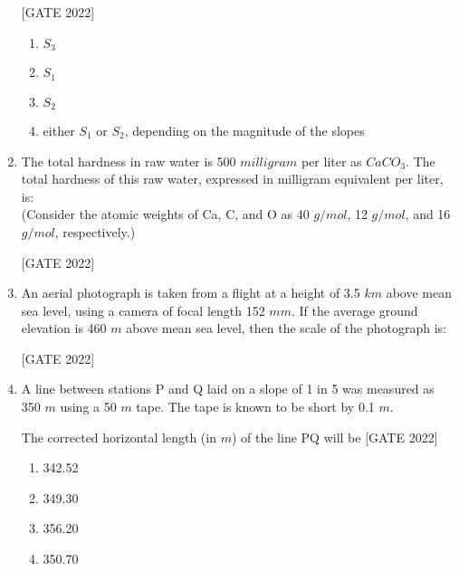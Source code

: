 \documentclass[journal,12pt,onecolumn]{IEEEtran}
\theoremstyle{remark}
\begin{document}
\begin{enumerate}
\hfill{[GATE 2022]}\begin{enumerate}
    \item  $ S_3  $
    \item  $ S_1  $
    \item  $ S_2  $
    \item either  $ S_1  $ or  $ S_2  $, depending on the magnitude of the slopes
\end{enumerate}

\item The total hardness in raw water is 500 $milligram$ per liter as $CaCO_3$. The total hardness of this raw water, expressed in milligram equivalent per liter, is:\\
(Consider the atomic weights of Ca, C, and O as 40 $g/mol$, 12 $g/mol$, and 16 $g/mol$, respectively.)

\hfill{[GATE 2022]}\begin{enumerate}
\end{enumerate}

\vspace{1em}

\item An aerial photograph is taken from a flight at a height of 3.5 $km$ above mean sea level, using a camera of focal length 152 $mm$. If the average ground elevation is 460 $m$ above mean sea level, then the scale of the photograph is:

\hfill{[GATE 2022]}\begin{enumerate}
\end{enumerate}

\item A line between stations P and Q laid on a slope of 1 in 5 was measured as 350 $m$ using a 50 $m$ tape. The tape is known to be short by 0.1 $m$.

The corrected horizontal length (in $m$) of the line PQ will be
\hfill{[GATE 2022]}
\begin{multicols}{4}
\begin{enumerate}
    \item 342.52
    \item 349.30
    \item 356.20
    \item 350.70
\end{enumerate}
\end{multicols}


\end{enumerate}
\end{document}
